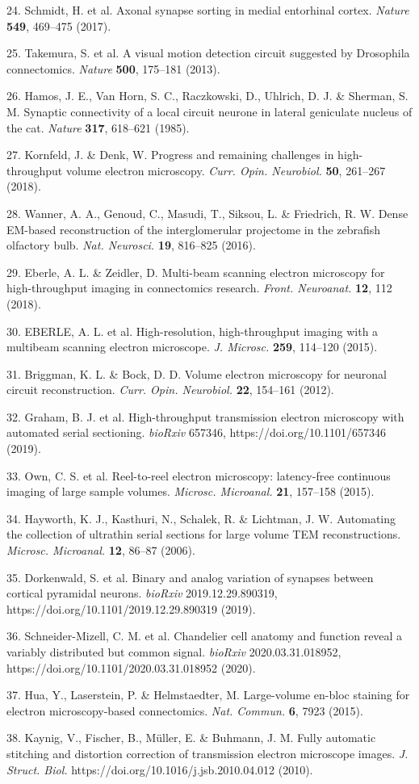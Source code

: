 \documentclass{article}
\begin{document}
\begin{hangpars}
24. Schmidt, H. et al. Axonal synapse sorting in medial entorhinal cortex. \emph{Nature} \textbf{549}, 469–475 (2017).

25. Takemura, S. et al. A visual motion detection circuit suggested by Drosophila connectomics. \emph{Nature} \textbf{500}, 175–181 (2013).

26. Hamos, J. E., Van Horn, S. C., Raczkowski, D., Uhlrich, D. J. \& Sherman, S. M. Synaptic connectivity of a local circuit neurone in lateral geniculate nucleus of the cat. \emph{Nature} \textbf{317}, 618–621 (1985).

27. Kornfeld, J. \& Denk, W. Progress and remaining challenges in high-throughput volume electron microscopy. \emph{Curr. Opin. Neurobiol.} \textbf{50}, 261–267 (2018).

28. Wanner, A. A., Genoud, C., Masudi, T., Siksou, L. \& Friedrich, R. W. Dense EM-based reconstruction of the interglomerular projectome in the zebrafish olfactory bulb. \emph{Nat. Neurosci.} \textbf{19}, 816–825 (2016).

29. Eberle, A. L. \& Zeidler, D. Multi-beam scanning electron microscopy for high-throughput imaging in connectomics research. \emph{Front. Neuroanat.} \textbf{12}, 112 (2018).

30. EBERLE, A. L. et al. High-resolution, high-throughput imaging with a multibeam scanning electron microscope. \emph{J. Microsc.} \textbf{259}, 114–120 (2015).

31. Briggman, K. L. \& Bock, D. D. Volume electron microscopy for neuronal circuit reconstruction. \emph{Curr. Opin. Neurobiol.} \textbf{22}, 154–161 (2012).

32. Graham, B. J. et al. High-throughput transmission electron microscopy with automated serial sectioning. \emph{bioRxiv} 657346, https://doi.org/10.1101/657346 (2019).

33. Own, C. S. et al. Reel-to-reel electron microscopy: latency-free continuous imaging of large sample volumes. \emph{Microsc. Microanal.} \textbf{21}, 157–158 (2015).

34. Hayworth, K. J., Kasthuri, N., Schalek, R. \& Lichtman, J. W. Automating the collection of ultrathin serial sections for large volume TEM reconstructions. \emph{Microsc. Microanal.} \textbf{12}, 86–87 (2006).

35. Dorkenwald, S. et al. Binary and analog variation of synapses between cortical pyramidal neurons. \emph{bioRxiv} 2019.12.29.890319, https://doi.org/10.1101/2019.12.29.890319 (2019).

36. Schneider-Mizell, C. M. et al. Chandelier cell anatomy and function reveal a variably distributed but common signal. \emph{bioRxiv} 2020.03.31.018952, https://doi.org/10.1101/2020.03.31.018952 (2020).

37. Hua, Y., Laserstein, P. \& Helmstaedter, M. Large-volume en-bloc staining for electron microscopy-based connectomics. \emph{Nat. Commun.} \textbf{6}, 7923 (2015).

38. Kaynig, V., Fischer, B., Müller, E. \& Buhmann, J. M. Fully automatic stitching and distortion correction of transmission electron microscope images. \emph{J. Struct. Biol.} https://doi.org/10.1016/j.jsb.2010.04.012 (2010).
\end{hangpars}
\end{document}
